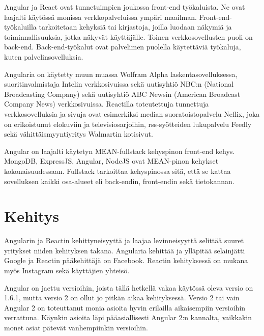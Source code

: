\documentclass[a4paper,12pt,twoside]{article} %
\begin{document}
\vspace{4mm}\noindent Angular ja React ovat tunnetuimpien joukossa front-end työkaluista. Ne ovat laajalti käytössä monissa verkkopalveluissa ympäri maailman. Front-end-työkaluilla tarkoitetaan kehyksiä tai kirjastoja, joilla luodaan näkymiä ja toiminnallisuuksia, jotka näkyvät käyttäjälle. Toinen verkkosovellusten puoli on back-end. Back-end-työkalut ovat palvelimen puolella käytettäviä työkaluja, kuten palvelinsovelluksia.

\vspace{4mm}\noindent Angularia on käytetty muun muassa Wolfram Alpha laskentasovelluksessa\cite{angularlist}, suoritinvalmistaja Intelin verkkosivuissa sekä uutisyhtiö NBC:n (National Broadcasting Company) sekä uutisyhtiö ABC Newsin (American Broadcast Company News) verkkosivuissa.\cite{angularwikipedia} Reactilla toteutettuja tunnettuja verkkosovelluksia ja sivuja ovat esimerkiksi median suoratoistopalvelu Neflix, joka on erikoistunut elokuviin ja televisiosarjoihin, rss-syötteiden lukupalvelu Feedly sekä vähittäismyyntiyritys Walmartin kotisivut. \cite{reactlist}

\vspace{4mm}\noindent Angular on laajalti käytetyn MEAN-fullstack kehyspinon front-end kehys. MongoDB, ExpressJS, Angular, NodeJS ovat MEAN-pinon kehykset kokonaisuudessaan. Fullstack tarkoittaa kehyspinossa sitä, että se kattaa sovelluksen kaikki osa-alueet eli back-endin, front-endin sekä tietokannan.

\newpage


\section{Kehitys}

Angularin ja Reactin kehittyneisyyttä ja laajaa levinneisyyttä selittää suuret yritykset niiden kehityksen takana. Angularia kehittää ja ylläpitää selainjätti Google ja Reactin pääkehittäjä on Facebook. Reactin kehityksessä on mukana myös Instagram sekä käyttäjien yhteisö.

\vspace{4mm}\noindent Angular on jaettu versioihin, joista tällä hetkellä vakaa käytössä oleva versio on 1.6.1, mutta versio 2 on ollut jo pitkän aikaa kehityksessä. Versio 2 tai vain Angular 2 on toteuttanut monia asioita hyvin erilailla aikaisempiin versioihin verrattuna. Käynkin asioita läpi pääasiallisesti Angular 2:n kannalta, vaikkakin monet asiat pätevät vanhempiinkin versioihin.
\end{document}
